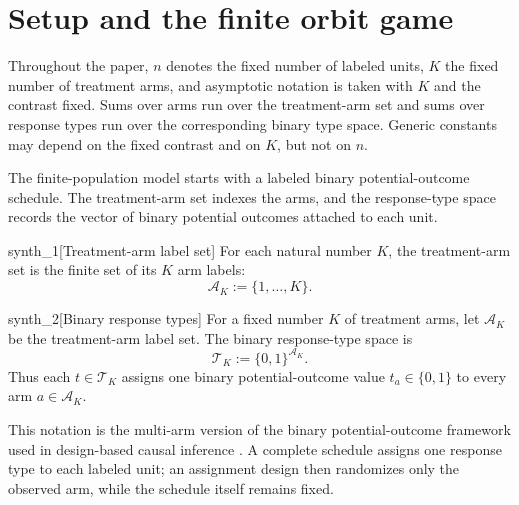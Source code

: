 \section{Setup and the finite orbit game}\label{sec:setup}

Throughout the paper, \(n\) denotes the fixed number of labeled units, \(K\) the fixed number of treatment arms, and asymptotic notation is taken with \(K\) and the contrast fixed. Sums over arms run over the treatment-arm set and sums over response types run over the corresponding binary type space. Generic constants may depend on the fixed contrast and on \(K\), but not on \(n\).

The finite-population model starts with a labeled binary potential-outcome schedule. The treatment-arm set  indexes the arms, and the response-type space records the vector of binary potential outcomes attached to each unit.

\begin{definitionv}{synth_1}[Treatment-arm label set]
For each natural number \(K\), the treatment-arm set is the finite set of its \(K\) arm labels:
\[
\mathcal A_K:=\{1,\ldots,K\}.
\]
\end{definitionv}

\begin{definitionv}{synth_2}[Binary response types]
For a fixed number \(K\) of treatment arms, let \(\mathcal A_K\) be the treatment-arm label set. The binary response-type space is
\[
\mathcal T_K := \{0,1\}^{\mathcal A_K}.
\]
Thus each \(t\in\mathcal T_K\) assigns one binary potential-outcome value \(t_a\in\{0,1\}\) to every arm \(a\in\mathcal A_K\).
\end{definitionv}

This notation is the multi-arm version of the binary potential-outcome framework used in design-based causal inference \citep{neyman_1990,rubin_1974,holland_1986,imbens_rubin_2015}. A complete schedule assigns one response type to each labeled unit; an assignment design then randomizes only the observed arm, while the schedule itself remains fixed.

